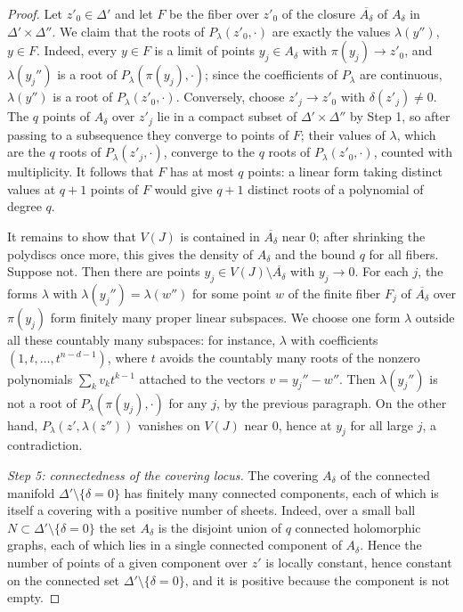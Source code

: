 \begin{proof}
Let $z'_0\in\Delta'$ and let $F$ be the fiber over $z'_0$ of the closure $\overline{A_\delta}$ of $A_\delta$ in $\Delta'\times\Delta''$. We claim that the roots of $P_\lambda(z'_0,\cdot)$ are exactly the values $\lambda(y'')$, $y\in F$. Indeed, every $y\in F$ is a limit of points $y_j\in A_\delta$ with $\pi(y_j)\to z'_0$, and $\lambda(y_j'')$ is a root of $P_\lambda(\pi(y_j),\cdot)$; since the coefficients of $P_\lambda$ are continuous, $\lambda(y'')$ is a root of $P_\lambda(z'_0,\cdot)$. Conversely, choose $z'_j\to z'_0$ with $\delta(z'_j)\neq0$. The $q$ points of $A_\delta$ over $z'_j$ lie in a compact subset of $\Delta'\times\Delta''$ by Step 1, so after passing to a subsequence they converge to points of $F$; their values of $\lambda$, which are the $q$ roots of $P_\lambda(z'_j,\cdot)$, converge to the $q$ roots of $P_\lambda(z'_0,\cdot)$, counted with multiplicity. It follows that $F$ has at most $q$ points: a linear form taking distinct values at $q+1$ points of $F$ would give $q+1$ distinct roots of a polynomial of degree $q$.

It remains to show that $V(J)$ is contained in $\overline{A_\delta}$ near $0$; after shrinking the polydiscs once more, this gives the density of $A_\delta$ and the bound $q$ for all fibers. Suppose not. Then there are points $y_j\in V(J)\setminus\overline{A_\delta}$ with $y_j\to0$. For each $j$, the forms $\lambda$ with $\lambda(y_j'')=\lambda(w'')$ for some point $w$ of the finite fiber $F_j$ of $\overline{A_\delta}$ over $\pi(y_j)$ form finitely many proper linear subspaces. We choose one form $\lambda$ outside all these countably many subspaces: for instance, $\lambda$ with coefficients $(1,t,\ldots,t^{n-d-1})$, where $t$ avoids the countably many roots of the nonzero polynomials $\sum_kv_kt^{k-1}$ attached to the vectors $v=y_j''-w''$. Then $\lambda(y_j'')$ is not a root of $P_\lambda(\pi(y_j),\cdot)$ for any $j$, by the previous paragraph. On the other hand, $P_\lambda(z',\lambda(z''))$ vanishes on $V(J)$ near $0$, hence at $y_j$ for all large $j$, a contradiction.

\emph{Step 5: connectedness of the covering locus.} The covering $A_\delta$ of the connected manifold $\Delta'\setminus\{\delta=0\}$ has finitely many connected components, each of which is itself a covering with a positive number of sheets. Indeed, over a small ball $N\subset\Delta'\setminus\{\delta=0\}$ the set $A_\delta$ is the disjoint union of $q$ connected holomorphic graphs, each of which lies in a single connected component of $A_\delta$. Hence the number of points of a given component over $z'$ is locally constant, hence constant on the connected set $\Delta'\setminus\{\delta=0\}$, and it is positive because the component is not empty.


\end{proof}
